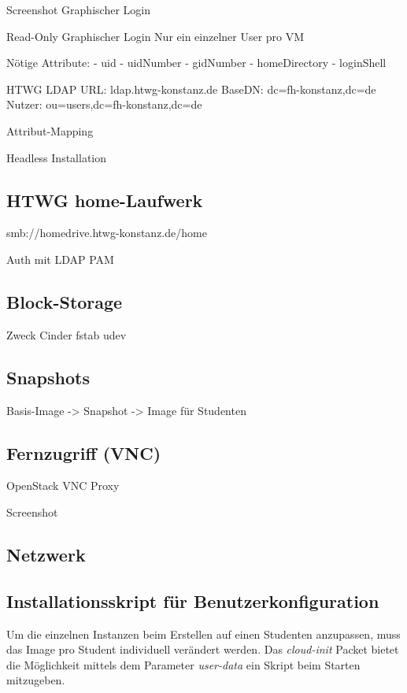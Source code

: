 Screenshot Graphischer Login

Read-Only
Graphischer Login
Nur ein einzelner User pro VM

Nötige Attribute:
- uid
- uidNumber
- gidNumber
- homeDirectory
- loginShell

HTWG LDAP
URL: ldap.htwg-konstanz.de
BaseDN: dc=fh-konstanz,dc=de
Nutzer: ou=users,dc=fh-konstanz,dc=de

Attribut-Mapping

Headless Installation

\subsection{HTWG home-Laufwerk}

smb://homedrive.htwg-konstanz.de/home

Auth mit LDAP
PAM

\subsection{Block-Storage}

Zweck
Cinder
fstab
udev

\subsection{Snapshots}

Basis-Image -> Snapshot -> Image für Studenten


\subsection{Fernzugriff (VNC)}

OpenStack VNC Proxy

Screenshot

\subsection{Netzwerk}

\subsection{Installationsskript  für Benutzerkonfiguration}

Um die einzelnen Instanzen beim Erstellen auf einen Studenten anzupassen, muss das Image pro Student individuell verändert werden. 
Das \emph{cloud-init} Packet bietet die Möglichkeit mittels dem Parameter \emph{user-data} ein Skript beim Starten mitzugeben. 

